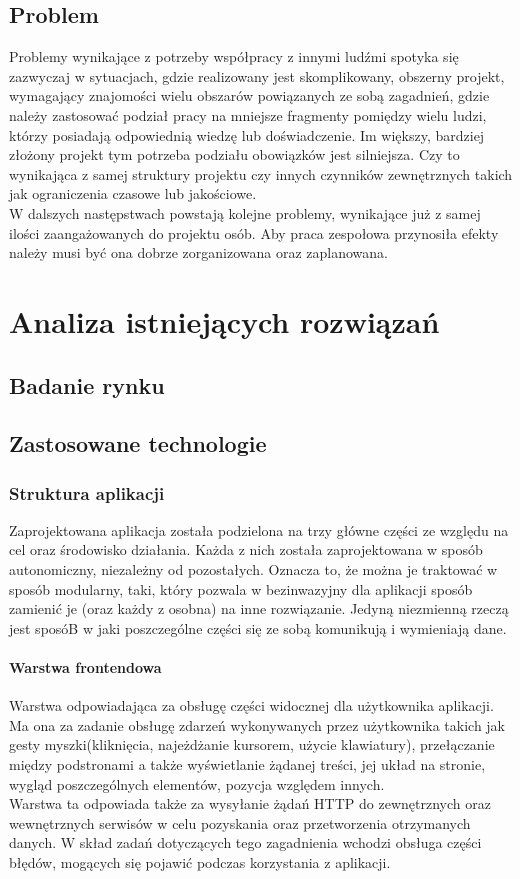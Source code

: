 \documentclass[eng,printmode]{mgr}
\begin{document}
\section{Problem}
Problemy wynikające z potrzeby współpracy z innymi ludźmi spotyka się zazwyczaj w sytuacjach, gdzie realizowany jest skomplikowany, obszerny projekt, wymagający znajomości wielu obszarów powiązanych ze sobą zagadnień, gdzie należy zastosować podział pracy na mniejsze fragmenty pomiędzy wielu ludzi, którzy posiadają odpowiednią wiedzę lub doświadczenie. Im większy, bardziej złożony projekt tym potrzeba podziału obowiązków jest silniejsza. Czy to wynikająca z samej struktury projektu czy innych czynników zewnętrznych takich jak ograniczenia czasowe lub jakościowe. \\
W dalszych następstwach powstają kolejne problemy, wynikające już z samej ilości zaangażowanych do projektu osób. Aby praca zespołowa przynosiła efekty należy musi być ona dobrze zorganizowana oraz zaplanowana.
\chapter{Analiza istniejących rozwiązań}  
\section{Badanie rynku}
\section{Zastosowane technologie}
\subsection{Struktura aplikacji}
Zaprojektowana aplikacja została podzielona na trzy główne części ze względu na cel oraz środowisko działania. Każda z nich została zaprojektowana w sposób autonomiczny, niezależny od pozostałych. Oznacza to, że można je traktować w sposób modularny, taki, który pozwala w bezinwazyjny dla aplikacji sposób zamienić je (oraz każdy z osobna) na inne rozwiązanie. Jedyną niezmienną rzeczą jest sposóB w jaki poszczególne części się ze sobą komunikują i wymieniają dane. 
\subsubsection{Warstwa frontendowa}
Warstwa odpowiadająca za obsługę części widocznej dla użytkownika aplikacji. Ma ona za zadanie obsługę zdarzeń wykonywanych przez użytkownika takich jak gesty myszki(kliknięcia, najeżdżanie kursorem, użycie klawiatury), przełączanie między podstronami a także wyświetlanie żądanej treści, jej układ na stronie, wygląd poszczególnych elementów, pozycja względem innych.
\\
Warstwa ta odpowiada także za wysyłanie żądań HTTP do zewnętrznych oraz wewnętrznych serwisów w celu pozyskania oraz przetworzenia otrzymanych danych. W skład zadań dotyczących tego zagadnienia wchodzi obsługa części błędów, mogących się pojawić podczas korzystania z aplikacji.
\end{document}
